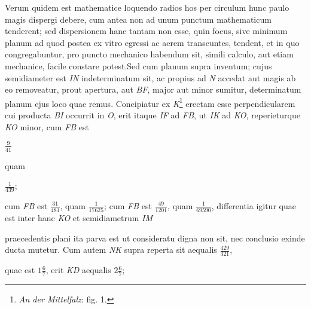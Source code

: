 \pstart [90 r\textsuperscript{o}] Verum quidem est mathematice loquendo radios hos per circulum hunc paulo magis dispergi debere, cum antea non ad unum punctum mathematicum\protect{} tenderent; sed dispersionem hanc tantam non esse, quin focus\protect{}, sive minimum planum ad quod postea ex vitro egressi ac aerem transeuntes, tendent, et in quo congregabuntur, pro puncto mechanico\protect{} habendum sit, simili calculo, aut etiam mechanice, facile constare potest.\pend \pstart Sed cum planum supra inventum; cujus semidiameter est \textit{IN} indeterminatum sit, ac propius ad \textit{N} accedat aut magis ab eo removeatur, prout apertura, aut \textit{BF}, major aut minor sumitur, determinatum planum ejus loco quae remus. Concipiatur ex \textit{K}\footnote{\textit{An der Mittelfalz}: fig. 1.} erectam esse perpendicularem cui producta \textit{BI} occurrit in \textit{O}, erit itaque \textit{IF} ad \textit{FB}, ut \textit{IK} ad \textit{KO}, reperieturque \textit{KO} minor, cum \textit{FB} est \rule[0mm]{0mm}{5mm} $\displaystyle\frac{9}{41}\:$\rule[-4mm]{0mm}{10mm}
quam \rule[0mm]{0mm}{5mm} $\displaystyle\frac{1}{439}$;\rule[-4mm]{0mm}{10mm} cum \textit{FB} est $\displaystyle\frac{31}{481}$, quam $\displaystyle\frac{1}{17625}$; cum \textit{FB} est $\displaystyle\frac{49}{1201}$, quam $\displaystyle\frac{1}{69590}$, differentia igitur quae est inter hanc \textit{KO} et semidiametrum \textit{IM}\rule[0mm]{0mm}{5mm} praecedentis plani ita parva est ut consideratu digna non sit, nec conclusio exinde ducta mutetur. Cum autem \textit{NK} supra reperta sit aequalis $\displaystyle\frac{429}{321}$,\rule[-4mm]{0mm}{10mm} quae est $\displaystyle1\frac{6}{7}$, erit \textit{KD} aequalis $\displaystyle2\frac{6}{7}$; \rule[-4mm]{0mm}{10mm}
